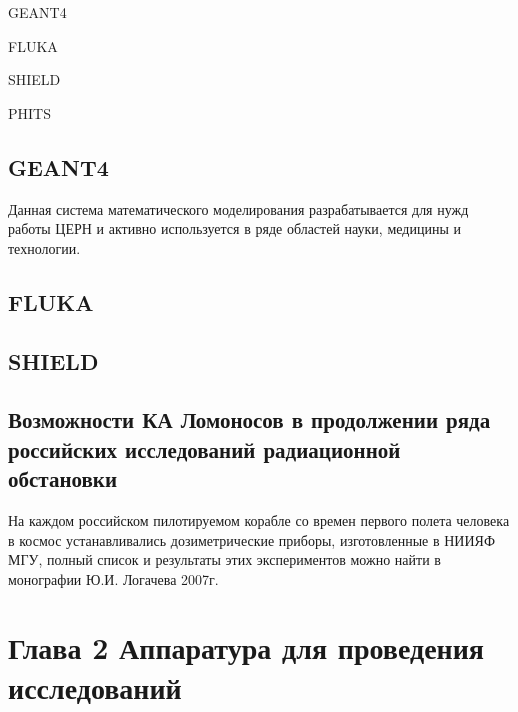 \documentclass[a4paper,portrait,12pt]{article}
\begin{document}
{{{{	GEANT4


	FLUKA


	SHIELD


	PHITS





\subsection*{	\textbf{GEANT4}}

Данная система математического моделирования разрабатывается для нужд работы ЦЕРН и активно используется в ряде областей науки, медицины и технологии.


\subsection*{	\textbf{FLUKA}}




\subsection*{	\textbf{SHIELD}}
















\subsection*{	\textbf{ }\textbf{Возможности КА Ломоносов в продолжении ряда российских исследований радиационной обстановки}}

На каждом российском пилотируемом корабле со времен первого полета человека в космос устанавливались дозиметрические приборы, изготовленные в НИИЯФ МГУ, полный список и результаты этих экспериментов можно найти в монографии Ю.И. Логачева 2007г.

















\newpage



\section*{\textbf{Глава 2 Аппаратура для проведения исследований}}

}}}}
\end{document}
